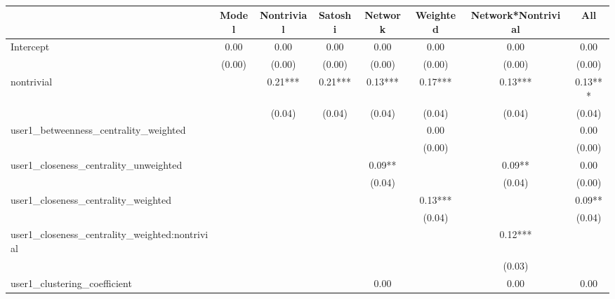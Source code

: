\begin{table}
\centering
\caption{}
\begin{center}
\begin{tabular}{lccccccc}
\hline
                                               & Model    & Nontrivial & Satoshi & Network & Weighted & Network*Nontrivial &   All    \\
\hline
\hline

Intercept                                      & 0.00     & 0.00       & 0.00    & 0.00    & 0.00     & 0.00               & 0.00     \\
                                               & (0.00)   & (0.00)     & (0.00)  & (0.00)  & (0.00)   & (0.00)             & (0.00)   \\
nontrivial                                     &          & 0.21***    & 0.21*** & 0.13*** & 0.17***  & 0.13***            & 0.13***  \\
                                               &          & (0.04)     & (0.04)  & (0.04)  & (0.04)   & (0.04)             & (0.04)   \\
user1_betweenness_centrality_weighted          &          &            &         &         & 0.00     &                    & 0.00     \\
                                               &          &            &         &         & (0.00)   &                    & (0.00)   \\
user1_closeness_centrality_unweighted          &          &            &         & 0.09**  &          & 0.09**             & 0.00     \\
                                               &          &            &         & (0.04)  &          & (0.04)             & (0.00)   \\
user1_closeness_centrality_weighted            &          &            &         &         & 0.13***  &                    & 0.09**   \\
                                               &          &            &         &         & (0.04)   &                    & (0.04)   \\
user1_closeness_centrality_weighted:nontrivial &          &            &         &         &          & 0.12***            &          \\
                                               &          &            &         &         &          & (0.03)             &          \\
user1_clustering_coefficient                   &          &            &         & 0.00    &          & 0.00               & 0.00     \\

\end{tabular}
\end{center}
\end{table}
